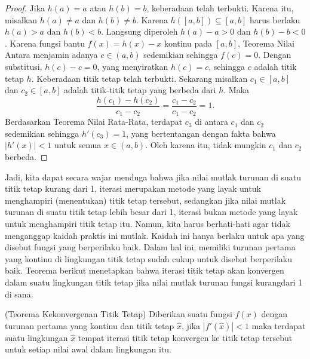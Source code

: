 \begin{proof}
Jika $h(a)=a$ atau $h(b)=b$, keberadaan telah terbukti. Karena itu,
misalkan $h(a)\neq a$ dan $h(b)\neq b$. Karena $h([a,b])\subseteq[a,b]$
harus berlaku $h(a)>a$ dan $h(b)<b$. Langsung diperoleh $h(a)-a>0$
dan $h(b)-b<0$. Karena fungsi bantu $f(x)=h(x)-x$ kontinu pada $[a,b]$,
Teorema Nilai Antara menjamin adanya $c\in(a,b)$ sedemikian sehingga
$f(c)=0$. Dengan substitusi, $h(c)-c=0$, yang menyiratkan $h(c)=c$,
sehingga $c$ adalah titik tetap $h$. Keberadaan titik tetap telah
terbukti. Sekarang misalkan $c_{1}\in[a,b]$ dan $c_{2}\in[a,b]$
adalah titik-titik tetap yang berbeda dari $h$. Maka 
\[
\frac{h(c_{1})-h(c_{2})}{c_{1}-c_{2}}=\frac{c_{1}-c_{2}}{c_{1}-c_{2}}=1.
\]
 Berdasarkan Teorema Nilai Rata-Rata, terdapat $c_{3}$ di antara
$c_{1}$ dan $c_{2}$ sedemikian sehingga $h'(c_{3})=1$, yang bertentangan
dengan fakta bahwa $|h'(x)|<1$ untuk semua $x\in(a,b)$. Oleh karena
itu, tidak mungkin $c_{1}$ dan $c_{2}$ berbeda.
\end{proof}
Jadi, kita dapat secara wajar menduga bahwa jika nilai mutlak turunan
di suatu titik tetap kurang dari 1, iterasi merupakan metode yang
layak untuk menghampiri (menentukan) titik tetap tersebut, sedangkan
jika nilai mutlak turunan di suatu titik tetap lebih besar dari 1,
iterasi bukan metode yang layak untuk menghampiri titik tetap itu.
Namun, kita harus berhati-hati agar tidak menganggap kaidah praktis
ini mutlak. Kaidah ini hanya berlaku untuk apa yang disebut fungsi
yang berperilaku baik. Dalam hal ini, memiliki turunan pertama yang
kontinu di lingkungan titik tetap sudah cukup untuk disebut berperilaku
baik. Teorema berikut menetapkan bahwa iterasi titik tetap akan konvergen
dalam suatu lingkungan titik tetap jika nilai mutlak turunan fungsi
kurangdari 1 di sana. 
\begin{thm}
\label{thm:fixedPointConvergence}(Teorema Kekonvergenan Titik Tetap)
 Diberikan suatu fungsi
$f(x)$ dengan turunan pertama yang kontinu dan titik tetap $\hat{x}$,
jika $|f'(\hat{x})|<1$ maka terdapat suatu lingkungan $\hat{x}$
tempat iterasi titik tetap konvergen ke titik tetap tersebut untuk
setiap nilai awal dalam lingkungan itu.
\end{thm}

